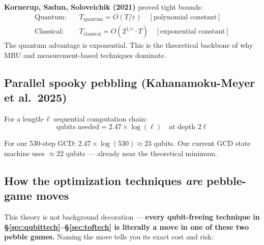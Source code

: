 \documentclass[11pt,a4paper]{article}
\begin{document}
\textbf{Kornerup, Sadun, Soloveichik (2021)} proved tight bounds:
\begin{align*}
  \text{Quantum:}   &\quad T_{\text{quantum}} = O(T/\varepsilon)           \quad [\text{polynomial constant}] \\
  \text{Classical:} &\quad T_{\text{classical}} = O(2^{1/\varepsilon} \cdot T) \quad [\text{exponential constant}]
\end{align*}
The quantum advantage is exponential. This is the theoretical backbone of why MBU and
measurement-based techniques dominate.

\subsection{Parallel spooky pebbling (Kahanamoku-Meyer et al.\ 2025)}

For a length-$\ell$ sequential computation chain:
\[
  \text{qubits needed} = 2.47 \times \log(\ell) \quad \text{at depth } 2\ell
\]

For our 530-step GCD: $2.47 \times \log(530) \approx 23$ qubits. Our current GCD state machine
uses $\approx22$ qubits --- already near the theoretical minimum.

\subsection{How the optimization techniques \emph{are} pebble-game moves}

This theory is not background decoration --- \textbf{every qubit-freeing technique in
\S\ref{sec:qubittech}--\S\ref{sec:toftech} is literally a move in one of these two pebble games.}
Naming the move tells you its exact cost and risk:
\end{document}
